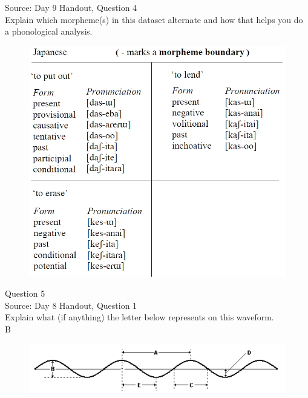 \documentclass[12pt]{article}
\begin{document}
Source: Day 9 Handout, Question 4\\

Explain which morpheme(s) in this dataset alternate and how that helps you do a phonological analysis.\\

\begin{figure}[H]
\includegraphics{../images/japanese_verbs.png}
\end{figure}

\newpage

{\large Question 5}\\

Source: Day 8 Handout, Question 1\\

Explain what (if anything) the letter below represents on this waveform.\\

B

\begin{figure}[H]
\includegraphics{../images/sinusoid.png}
\end{figure}

\newpage
\end{document}
